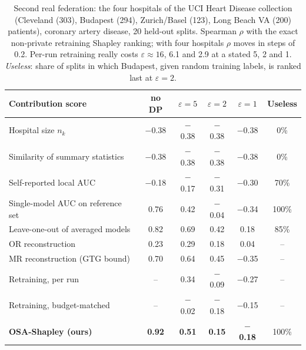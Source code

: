 \begin{table}[t]
\caption{Second real federation: the four hospitals of the UCI Heart Disease collection (Cleveland (303), Budapest (294), Zurich/Basel (123), Long Beach VA (200) patients), coronary artery disease, 20 held-out splits. Spearman $\rho$ with the exact non-private retraining Shapley ranking; with four hospitals $\rho$ moves in steps of 0.2. Per-run retraining really costs $\varepsilon\approx16$, 6.1 and 2.9 at a stated 5, 2 and 1. \emph{Useless}: share of splits in which Budapest, given random training labels, is ranked last at $\varepsilon=2$.}
\centering\scriptsize
\setlength{\tabcolsep}{3pt}
\begin{tabular}{lccccc}
\toprule
Contribution score & no DP & $\varepsilon=5$ & $\varepsilon=2$ & $\varepsilon=1$ & Useless \\
\midrule
Hospital size $n_k$ & \ensuremath{-}0.38 & \ensuremath{-}0.38 & \ensuremath{-}0.38 & \ensuremath{-}0.38 & 0\% \\
Similarity of summary statistics & \ensuremath{-}0.38 & \ensuremath{-}0.38 & \ensuremath{-}0.38 & \ensuremath{-}0.38 & 0\% \\
Self-reported local AUC & \ensuremath{-}0.18 & \ensuremath{-}0.17 & \ensuremath{-}0.31 & \ensuremath{-}0.30 & 70\% \\
Single-model AUC on reference set & 0.76 & 0.42 & \ensuremath{-}0.04 & \ensuremath{-}0.34 & 100\% \\
Leave-one-out of averaged models & 0.82 & 0.69 & 0.42 & 0.18 & 85\% \\
OR reconstruction & 0.23 & 0.29 & 0.18 & 0.04 & -- \\
MR reconstruction (GTG bound) & 0.70 & 0.64 & 0.45 & \ensuremath{-}0.35 & -- \\
Retraining, per run & -- & 0.34 & \ensuremath{-}0.09 & \ensuremath{-}0.27 & -- \\
Retraining, budget-matched & -- & \ensuremath{-}0.02 & \ensuremath{-}0.18 & \ensuremath{-}0.15 & -- \\
\textbf{OSA-Shapley (ours)} & \textbf{0.92} & \textbf{0.51} & \textbf{0.15} & \textbf{\ensuremath{-}0.18} & 100\% \\
\bottomrule
\end{tabular}
\label{tab:heart}
\end{table}
